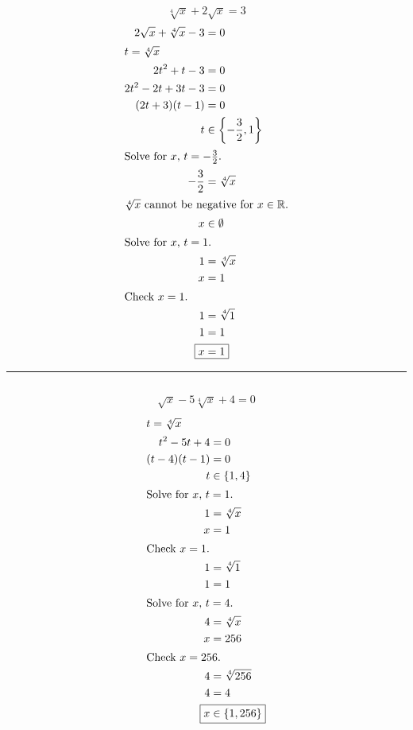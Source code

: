 	\subsection{}
		\[\sqrt[4]{x} + 2\sqrt{x} = 3\]
		\begin{align*}
			2\sqrt{x} + \sqrt[4]{x} - 3 &= 0 \\
			\intertext{$t = \sqrt[4]{x}$}
			2t^2 + t - 3 &= 0 \\
			2t^2 - 2t + 3t - 3 &= 0 \\
			(2t + 3)(t - 1) &= 0 \\
			t &\in \left\{-\frac{3}{2}, 1\right\} \\
			\intertext{Solve for $x$, $t = -\frac{3}{2}$.}
			-\frac{3}{2} &= \sqrt[4]{x} \\
			\intertext{$\sqrt[4]{x}$ cannot be negative for $x \in \mathbb{R}$.}
			x &\in \emptyset \\
			\intertext{Solve for $x$, $t = 1$.}
			1 &= \sqrt[4]{x} \\
			x &= 1 \\
			\intertext{Check $x = 1$.}
			1 &= \sqrt[4]{1} \\
			1 &= 1 \\
			\Aboxed{x &= 1}
		\end{align*}
		\hrule{}

	\subsection{}
		\[\sqrt{x} - 5\sqrt[4]{x} + 4 = 0\]
		\begin{align*}
			\intertext{$t = \sqrt[4]{x}$}
			t^2 - 5t + 4 &= 0 \\
			(t - 4)(t - 1) &= 0 \\
			t &\in \{1, 4\} \\
			\intertext{Solve for $x$, $t = 1$.}
			1 &= \sqrt[4]{x} \\
			x &= 1 \\
			\intertext{Check $x = 1$.}
			1 &= \sqrt[4]{1} \\
			1 &= 1 \\
			\intertext{Solve for $x$, $t = 4$.}
			4 &= \sqrt[4]{x} \\
			x &= 256 \\
			\intertext{Check $x = 256$.}
			4 &= \sqrt[4]{256} \\
			4 &= 4 \\
			\Aboxed{x &\in \{1, 256\}}
		\end{align*}


